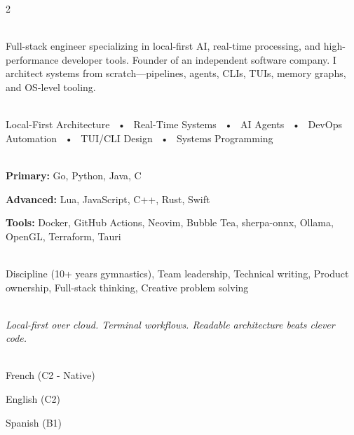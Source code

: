 \documentclass[lighthipster]{simplehipstercv}
\begin{document}
\begin{paracol}{2}

\paracolbackgroundoptions

\footnotesize
{\setasidefontcolour
\flushleft

\vspace{1em}

\\[0.5em]

{\footnotesize
Full-stack engineer specializing in local-first AI, real-time processing, and high-performance developer tools. Founder of an independent software company. I architect systems from scratch—pipelines, agents, CLIs, TUIs, memory graphs, and OS-level tooling.}
\bigskip

 \\[0.5em]

Local-First Architecture ~•~
Real-Time Systems ~•~
AI Agents ~•~
DevOps Automation ~•~
TUI/CLI Design ~•~
Systems Programming

\bigskip

\\[0.5em]

\textbf{Primary:}
Go, Python, Java, C

\textbf{Advanced:}
Lua, JavaScript, C++, Rust, Swift

\textbf{Tools:}
Docker, GitHub Actions, Neovim, Bubble Tea, sherpa-onnx, Ollama, OpenGL, Terraform, Tauri

\bigskip

\\[0.5em]

Discipline (10+ years gymnastics), Team leadership, Technical writing, Product ownership, Full-stack thinking, Creative problem solving

\bigskip

\\[0.5em]

{\footnotesize\textit{Local-first over cloud. Terminal workflows. Readable architecture beats clever code.}}

\bigskip

\\[0.5em]

French (C2 - Native)

English (C2)

Spanish (B1)

}
\end{paracol}
\end{document}
